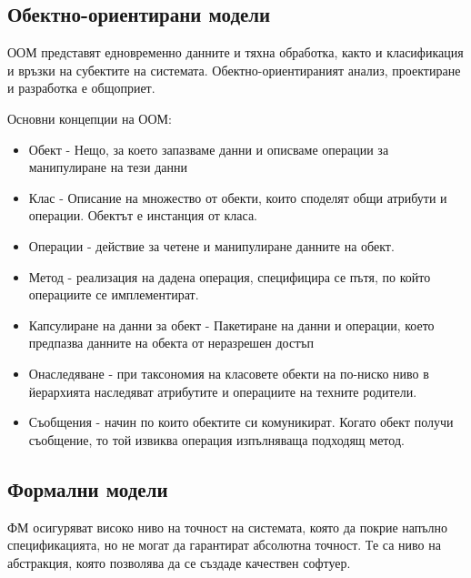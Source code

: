 \documentclass[fleqn,12pt]{article}
\begin{document}
\subsection{Обектно-ориентирани модели}
ООМ представят едновременно данните и тяхна обработка, както и класификация и връзки на субектите на системата. Обектно-ориентираният анализ, проектиране и разработка е общоприет.

Основни концепции на ООМ:
\begin{itemize}
	\item Обект - Нещо, за което запазваме данни и описваме операции за манипулиране на тези данни
	\item Клас - Описание на множество от обекти, които споделят общи атрибути и операции. Обектът е инстанция от класа.
	\item Операции - действие за четене и манипулиране данните на обект. 
	\item Метод - реализация на дадена операция, специфицира се пътя, по който операциите се имплементират.
	\item Капсулиране на данни за обект - Пакетиране на данни и операции, което предпазва данните на обекта от неразрешен достъп
	\item Онаследяване - при таксономия на класовете обекти на по-ниско ниво в йерархията наследяват атрибутите и операциите на техните родители.
	\item Съобщения - начин по които обектите си комуникират. Когато обект получи съобщение, то той извиква операция изпълняваща подходящ метод.
\end{itemize}


\subsection{Формални модели}
ФМ осигуряват високо ниво на точност на системата, която да покрие напълно спецификацията, но не могат да гарантират абсолютна точност. Те са ниво на абстракция, която позволява да се създаде качествен софтуер. 
\end{document}
